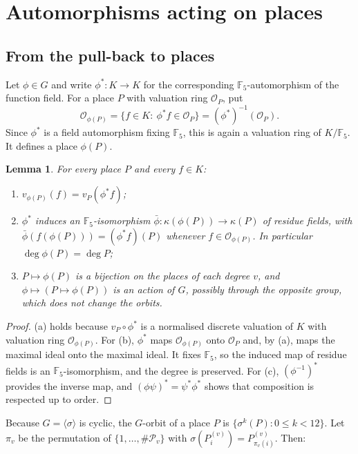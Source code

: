 \documentclass[11pt]{amsart}
\newtheorem{lemma}[theorem]{Lemma}
\theoremstyle{definition}
\theoremstyle{remark}
\newcommand{\F}{\mathbb{F}}
\newcommand{\Pl}{\mathcal{P}}
\begin{document}
\section{Automorphisms acting on places}

\subsection{From the pull-back to places}
Let $\phi\in G$ and write $\phi^*\colon K\to K$ for the corresponding $\F_5$-automorphism of the function field. For a place $P$ with valuation ring $\mathcal{O}_P$, put
\[
\mathcal{O}_{\phi(P)}=\{f\in K:\ \phi^*f\in\mathcal{O}_P\}=(\phi^*)^{-1}(\mathcal{O}_P).
\]
Since $\phi^*$ is a field automorphism fixing $\F_5$, this is again a valuation ring of $K/\F_5$. It defines a place $\phi(P)$.

\begin{lemma}\label{lem:basic}
For every place $P$ and every $f\in K$:
\begin{enumerate}[label=\textup{(\alph*)}]
\item $v_{\phi(P)}(f)=v_P(\phi^*f)$;
\item $\phi^*$ induces an $\F_5$-isomorphism $\bar\phi\colon\kappa(\phi(P))\to\kappa(P)$ of residue fields, with $\bar\phi(f(\phi(P)))=(\phi^*f)(P)$ whenever $f\in\mathcal{O}_{\phi(P)}$. In particular $\deg\phi(P)=\deg P$;
\item $P\mapsto\phi(P)$ is a bijection on the places of each degree $v$, and $\phi\mapsto(P\mapsto\phi(P))$ is an action of $G$, possibly through the opposite group, which does not change the orbits.
\end{enumerate}
\end{lemma}

\begin{proof}
(a) holds because $v_P\circ\phi^*$ is a normalised discrete valuation of $K$ with valuation ring $\mathcal{O}_{\phi(P)}$. For (b), $\phi^*$ maps $\mathcal{O}_{\phi(P)}$ onto $\mathcal{O}_P$ and, by (a), maps the maximal ideal onto the maximal ideal. It fixes $\F_5$, so the induced map of residue fields is an $\F_5$-isomorphism, and the degree is preserved. For (c), $(\phi^{-1})^*$ provides the inverse map, and $(\phi\psi)^*=\psi^*\phi^*$ shows that composition is respected up to order.
\end{proof}

Because $G=\langle\sigma\rangle$ is cyclic, the $G$-orbit of a place $P$ is $\{\sigma^k(P):0\le k<12\}$. Let $\pi_v$ be the permutation of $\{1,\dots,\#\Pl_v\}$ with $\sigma(P^{(v)}_i)=P^{(v)}_{\pi_v(i)}$. Then:
\end{document}
